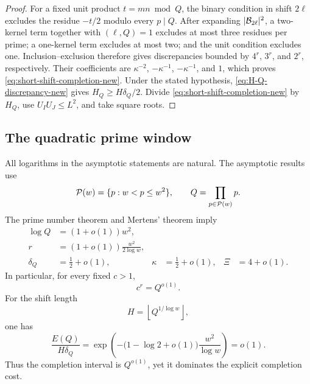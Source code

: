\begin{proof}
For a fixed unit product $t=mn\bmod Q$, the binary condition in shift $2\ell$ excludes the residue $-t/2$ modulo every $p\mid Q$.  After expanding $|\mathcal B_{2\ell}|^2$, a two-kernel term together with $(\ell,Q)=1$ excludes at most three residues per prime; a one-kernel term excludes at most two; and the unit condition excludes one.  Inclusion--exclusion therefore gives discrepancies bounded by $4^r$, $3^r$, and $2^r$, respectively.  Their coefficients are $\kappa^{-2}$, $-\kappa^{-1}$, $-\kappa^{-1}$, and $1$, which proves \eqref{eq:short-shift-completion-new}.  Under the stated hypothesis, \eqref{eq:H-Q-discrepancy-new} gives $H_Q\ge H\delta_Q/2$.  Divide \eqref{eq:short-shift-completion-new} by $H_Q$, use $U_IU_J\le L^2$, and take square roots.
\end{proof}

\subsection{The quadratic prime window}

All logarithms in the asymptotic statements are natural.  The asymptotic results use
\begin{equation}\label{eq:quadratic-window-new}
 \mathcal P(w)=\{p:w<p\le w^2\},
 \qquad
 Q=\prod_{p\in\mathcal P(w)}p.
\end{equation}
The prime number theorem and Mertens' theorem imply
\begin{align}
 \log Q&=(1+o(1))w^2,\label{eq:logQ-asymptotic-new}\\
 r&=(1+o(1))\frac{w^2}{2\log w},\label{eq:r-asymptotic-new}\\
 \delta_Q&=\frac12+o(1),
 &\kappa&=\frac12+o(1),
 &\Xi&=4+o(1).\label{eq:local-products-asymptotic-new}
\end{align}
In particular, for every fixed $c>1$,
\begin{equation}\label{eq:c-r-is-Q-o1}
 c^r=Q^{o(1)}.
\end{equation}
For the shift length
\begin{equation}\label{eq:H-subpower-choice-new}
 H=\left\lfloor Q^{1/\log w}\right\rfloor,
\end{equation}
one has
\begin{equation}\label{eq:completion-decay-new}
 \frac{E(Q)}{H\delta_Q}
 =\exp\left(
  -\bigl(1-\log2+o(1)\bigr)\frac{w^2}{\log w}
 \right)=o(1).
\end{equation}
Thus the completion interval is $Q^{o(1)}$, yet it dominates the explicit completion cost.
